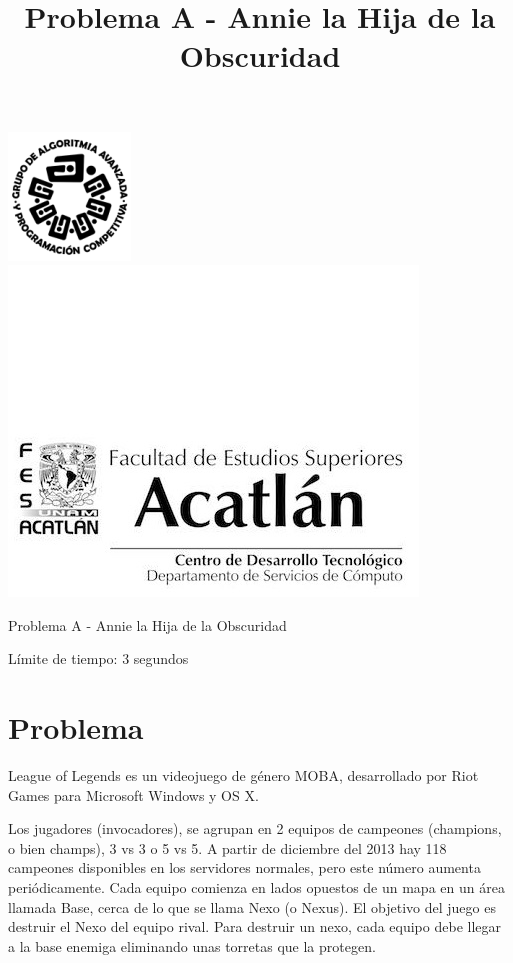 \documentclass[letter,10pt]{article}
\date{}
\begin{document}
\title{Problema A - Annie la Hija de la Obscuridad}

\includegraphics[scale=0.6]{logo} \hspace*{9.00cm}
\includegraphics[scale=0.5]{dsc} 
\bigskip
\begin{center}
	\Large Problema A - Annie la Hija de la Obscuridad
\end{center}

\begin{flushright}
Límite de tiempo: 3 segundos
\par\end{flushright}
\bigskip

\section*{Problema}

League of Legends es un videojuego de género MOBA, desarrollado por Riot Games para Microsoft Windows y OS X.

Los jugadores (invocadores), se agrupan en 2 equipos de campeones (champions, o bien champs), 3 vs 3 o 5 vs 5. A partir de diciembre del 2013 hay 118 campeones disponibles en los servidores normales, pero este número aumenta periódicamente. Cada equipo comienza en lados opuestos de un mapa en un área llamada Base, cerca de lo que se llama Nexo (o Nexus). El objetivo del juego es destruir el Nexo del equipo rival. Para destruir un nexo, cada equipo debe llegar a la base enemiga eliminando unas torretas que la protegen.
\end{document}
